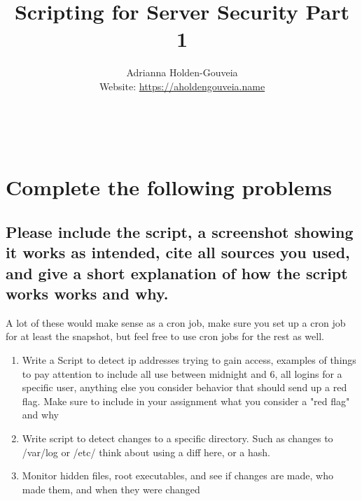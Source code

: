 \documentclass[12pt]{article}
\title{Scripting for Server Security Part 1}
\author{
        Adrianna Holden-Gouveia \\
        Website: \url{https://aholdengouveia.name}\\ 
        \date{\vspace{-5ex}}
        \faLinkedin{: aholdengouveia} \\
        \faGithub {: aholdengouveia} \\
        }
\begin{document}
    

\maketitle



\section*{Complete the following problems}

\subsection*{Please include the script, a screenshot showing it works as intended, cite all sources you used, and give a short explanation of how the script works works and why.}
A lot of these would make sense as a cron job, make sure you set up a cron job for at least the snapshot, but feel free to use cron jobs for the rest as well.
    \begin{enumerate}
        \item Write a Script to detect ip addresses trying to gain access, examples of things to pay attention to include all use between midnight and 6, all logins for a specific user, anything else you consider behavior that should send up a red flag.  Make sure to include in your assignment what you consider a "red flag" and why
        \item Write script to detect changes to a specific directory.  Such as changes to /var/log or /etc/ think about using a diff here, or a hash.
        \item Monitor hidden files, root executables, and see if changes are made, who made them, and when they were changed
    \end{enumerate}
\end{document}
